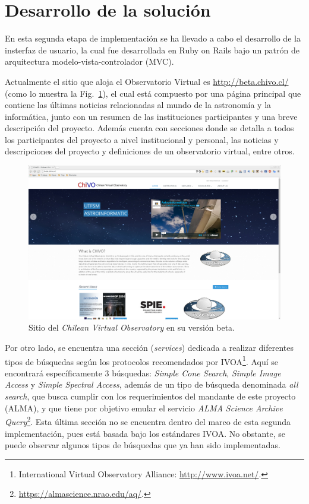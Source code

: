 \section{Desarrollo de la solución}

En esta segunda etapa de implementación se ha llevado a cabo el
desarrollo de la insterfaz de usuario, la cual fue desarrollada en
Ruby on Rails bajo un patrón de arquitectura modelo-vista-controlador
(MVC).

Actualmente el sitio que aloja el Observatorio Virtual es
\url{http://beta.chivo.cl/} (como lo muestra la Fig.~\ref{img:chivo}),
el cual está compuesto por una página principal que contiene las
últimas noticias relacionadas al mundo de la astronomía y la
informática, junto con un resumen de las instituciones participantes y
una breve descripción del proyecto. Además cuenta con secciones donde
se detalla a todos los participantes del proyecto a nivel
institucional y personal, las noticias y descripciones del proyecto y
definiciones de un observatorio virtual, entre otros.

\begin{figure}[ht!]
    \begin{center}
	\includegraphics[scale=.2]{img/chivo}
    \end{center}
    \caption{Sitio del \emph{Chilean Virtual Observatory} en su
      versión beta.}\label{img:chivo}
\end{figure}

Por otro lado, se encuentra una sección (\emph{services}) dedicada a
realizar diferentes tipos de búsquedas según los protocolos
recomendados por IVOA\footnote{International Virtual Observatory
Alliance: \url{http://www.ivoa.net/}.}. Aquí se encontrará
específicamente 3 búsquedas: \emph{Simple Cone Search}, \emph{Simple
Image Access} y \emph{Simple Spectral Access}, además de un tipo de
búsqueda denominada \emph{all search}, que busca cumplir con los
requerimientos del mandante de este proyecto (ALMA), y que tiene por
objetivo emular el servicio \emph{ALMA Science Archive
Query}\footnote{\url{https://almascience.nrao.edu/aq/}.}. Esta última
sección no se encuentra dentro del marco de esta segunda
implementación, pues está basada bajo los estándares IVOA. No
obstante, se puede observar algunos tipos de búsquedas que ya han sido
implementadas.

